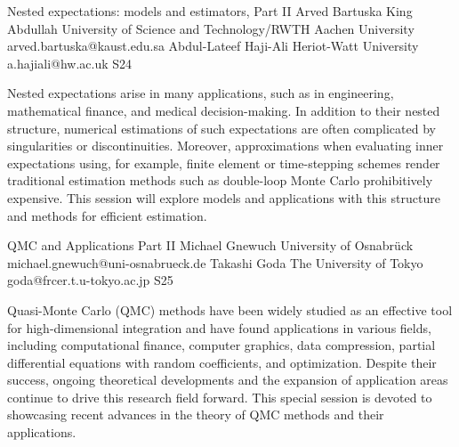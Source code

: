\begin{session}
 {Nested expectations: models and estimators, Part II}%
 {Arved Bartuska}%
 {King Abdullah University of Science and Technology/RWTH Aachen University}%
 {arved.bartuska@kaust.edu.sa}%
 {Abdul-Lateef Haji-Ali}%
 {Heriot-Watt University}%
 {a.hajiali@hw.ac.uk}%
 {S24}%
{}

 Nested expectations arise in many applications, such as in engineering, mathematical finance, and medical decision-making. In addition to their nested structure, numerical estimations of such expectations are often complicated by singularities or discontinuities. Moreover, approximations when evaluating inner expectations using, for example, finite element or time-stepping schemes render traditional estimation methods such as double-loop Monte Carlo prohibitively expensive. This session will explore models and applications with this structure and methods for efficient estimation.
\end{session}



\clearpage

\begin{session}
 {QMC and Applications Part II}%
 {Michael Gnewuch}%
 {University of Osnabrück}%
 {michael.gnewuch@uni-osnabrueck.de}%
 {Takashi Goda}%
 {The University of Tokyo}%
 {goda@frcer.t.u-tokyo.ac.jp}%
 {S25}%
 {}%

 Quasi-Monte Carlo (QMC) methods have been widely studied as an effective tool for high-dimensional integration and have found applications in various fields, including computational finance, computer graphics, data compression, partial differential equations with random coefficients, and %
 optimization.
 Despite their success, ongoing theoretical developments and the expansion of application areas continue to drive this research field forward. This special session is devoted to showcasing recent advances in the theory of QMC methods and their applications.
\end{session}

